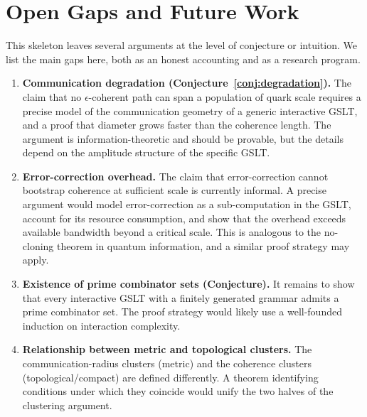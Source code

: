 \chapter{Open Gaps and Future Work}
\label{sec:gaps}

This skeleton leaves several arguments at the level of conjecture
or intuition.
We list the main gaps here, both as an honest accounting and as a
research program.

\begin{enumerate}[label=\textbf{Gap \arabic*.}, leftmargin=*, itemsep=8pt]

  \item \textbf{Communication degradation (Conjecture~\ref{conj:degradation}).}
        The claim that no $\epsilon$-coherent path can span a
        population of quark scale requires a precise model of the
        communication geometry of a generic interactive GSLT, and
        a proof that diameter grows faster than the coherence
        length.
        The argument is information-theoretic and should be
        provable, but the details depend on the amplitude structure
        of the specific GSLT.

  \item \textbf{Error-correction overhead.}
        The claim that error-correction cannot bootstrap coherence
        at sufficient scale is currently informal.
        A precise argument would model error-correction as a
        sub-computation in the GSLT, account for its resource
        consumption, and show that the overhead exceeds available
        bandwidth beyond a critical scale.
        This is analogous to the no-cloning theorem in quantum
        information, and a similar proof strategy may apply.

  \item \textbf{Existence of prime combinator sets (Conjecture).}
        It remains to show that every interactive GSLT with a
        finitely generated grammar admits a prime combinator set.
        The proof strategy would likely use a well-founded
        induction on interaction complexity.

  \item \textbf{Relationship between metric and topological clusters.}
        The communication-radius clusters (metric) and the
        coherence clusters (topological/compact) are defined
        differently.
        A theorem identifying conditions under which they coincide
        would unify the two halves of the clustering argument.


\end{enumerate}
